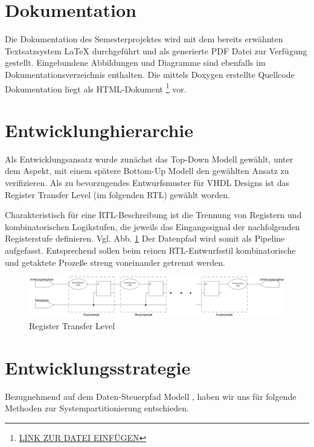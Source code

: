 \documentclass{article}
\begin{document}
\section{Dokumentation}
Die Dokumentation des Semesterprojektes wird mit dem bereits erwähnten Textsatzsystem LaTeX
durchgeführt und als generierte PDF Datei zur Verfügung gestellt. Eingebundene Abbildungen und 
Diagramme sind ebenfalls im Dokumentationsverzeichnis enthalten.
Die mittels Doxygen erstellte Quellcode Dokumentation liegt als HTML-Dokument 
\footnote{\href{}{LINK ZUR DATEI EINFÜGEN}} vor.


\section{Entwicklunghierarchie}
Als Entwicklungsansatz wurde zunächst das Top-Down Modell gewählt, unter dem Aspekt, mit einem
spätere Bottom-Up Modell den gewählten Ansatz zu verifizieren. Als zu bevorzugendes Entwurfsmuster
für VHDL Designs ist das Register Transfer Level (im folgenden RTL) gewählt worden.

Charakteristisch für eine RTL-Beschreibung ist die Trennung von Registern und kombinatorischen
Logikstufen, die jeweils das Eingangssignal der nachfolgenden Registerstufe definieren. Vgl. Abb.
\ref{fig:RTL-Logic} Der Datenpfad wird somit als Pipeline aufgefasst. Entsprechend sollen beim reinen RTL-Entwurfsstil 
kombinatorische und getaktete Prozeße streng voneinander getrennt werden.

\begin{figure}[here]
	\begin{center}
		\includegraphics[width=0.65 \textwidth]{includes/RTL-Logic.eps}
		\caption[Darstellung RTL]{Register Transfer Level}
		\label{fig:RTL-Logic}
	\end{center}
\end{figure}

\newpage
\section{Entwicklungsstrategie}
Bezugnehmend auf dem Daten-Steuerpfad Modell \cite{Reichardt}, 
haben wir uns für folgende Methoden zur Systempartitionierung entschieden.
\end{document}
